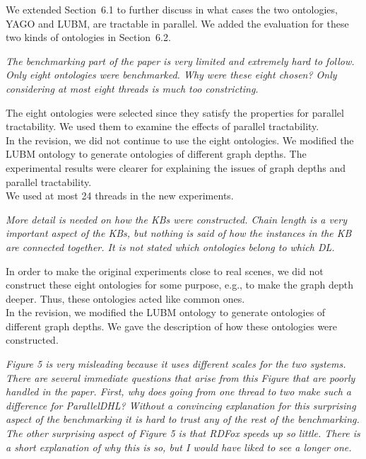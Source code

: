 \documentclass{article}
\let\quoteOld\quote
\let\endquoteOld\endquote
\renewenvironment{quote}{\quoteOld\itshape}{\endquoteOld}
\begin{document}
We extended Section~6.1 to further discuss in what cases
the two ontologies, YAGO and LUBM, are tractable in parallel.
We added the evaluation for these two kinds of ontologies in Section~6.2.

\begin{quote}
The benchmarking part of the paper is very limited and extremely hard to
follow.    Only eight ontologies were benchmarked.  Why were these eight
chosen?  Only considering at most eight threads is much too constricting.
\end{quote}

The eight ontologies were selected since they satisfy the properties for parallel tractability.
We used them to examine the effects of parallel tractability.\\

In the revision, we did not continue to use the eight ontologies.
We modified the LUBM ontology to generate ontologies of different graph depths.
The experimental results were clearer for explaining the issues of graph depths
and parallel tractability.\\

We used at most 24 threads in the new experiments.


\begin{quote}
More detail is needed on how the KBs were constructed.  Chain length is a
very important aspect of the KBs, but nothing is said of how the instances
in the KB are connected together.  It is not stated which ontologies belong
to which DL.
\end{quote}

In order to make the original experiments close to real scenes, we did not
construct these eight ontologies for some purpose, e.g., to
make the graph depth deeper. Thus, these ontologies acted like common ones.\\

In the revision, we modified the LUBM ontology to generate ontologies of
different graph depths. We gave the description of how these ontologies
were constructed.


\begin{quote}
Figure 5 is very misleading because it uses different scales for the two
systems.   There are several immediate questions that arise from this Figure
that are poorly handled in the paper.  First, why does going from one thread
to two make such a difference for ParallelDHL?  Without a convincing
explanation for this surprising aspect of the benchmarking it is hard to
trust any of the rest of the benchmarking.  The other surprising aspect of
Figure 5 is that RDFox speeds up so little.  There is a short explanation of
why this is so, but I would have liked to see a longer one.
\end{quote}
\end{document}
